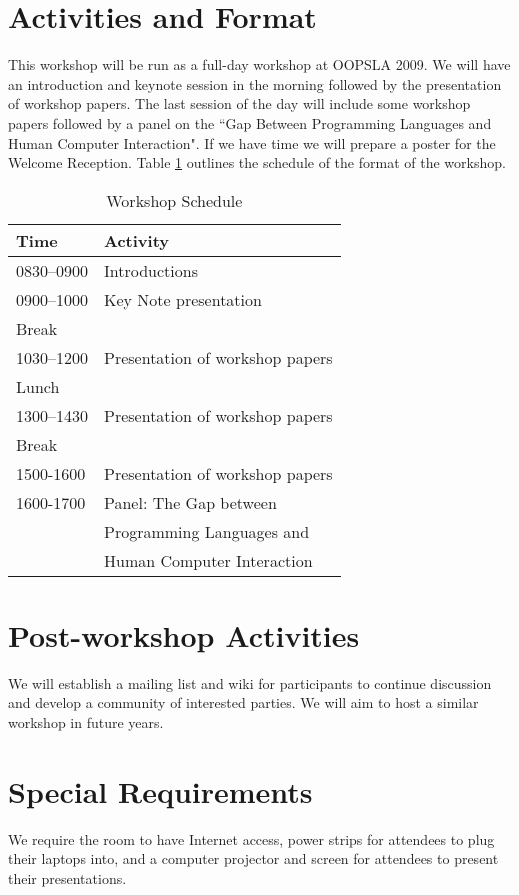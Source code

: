 \documentclass{acm_proc_article-sp}
\begin{document}
\section{Activities and Format}

This workshop will be run as a full-day workshop at OOPSLA 2009. We will have an introduction and keynote session in the morning followed by the presentation of workshop papers. The last session of the day will include some workshop papers followed by a panel on the ``Gap Between Programming Languages and Human Computer Interaction". If we have time we will prepare a poster for the Welcome Reception. Table \ref{tab:schedule} outlines the schedule of the format of the workshop.


\begin{table} [!htbp] %
\caption{Workshop Schedule}
\begin{tabular}{|l|l|}
\hline \textbf{Time}   & \textbf{Activity}\\
\hline 0830--0900    & Introductions\\
\hline 0900--1000    & Key Note presentation\\
\hline Break              & \\
\hline 1030--1200   & Presentation of workshop papers\\
\hline Lunch             & \\
\hline 1300--1430   & Presentation of workshop papers\\
\hline Break              & \\
\hline 1500-1600    & Presentation of workshop papers\\
\hline 1600-1700    & Panel: The Gap between\\
                                   & Programming Languages and\\
                                    & Human Computer Interaction\\
\hline
\end{tabular}
\label{tab:schedule}
\end{table}

\section{Post-workshop Activities}

We will establish a mailing list and wiki for participants to continue discussion and develop a community of 
interested parties. We will aim to host a similar workshop in future years.

\section{Special Requirements}

We require the room to have Internet access, power strips for attendees to plug their laptops into, and a computer projector and screen for attendees to present their presentations.


 
\end{document}
